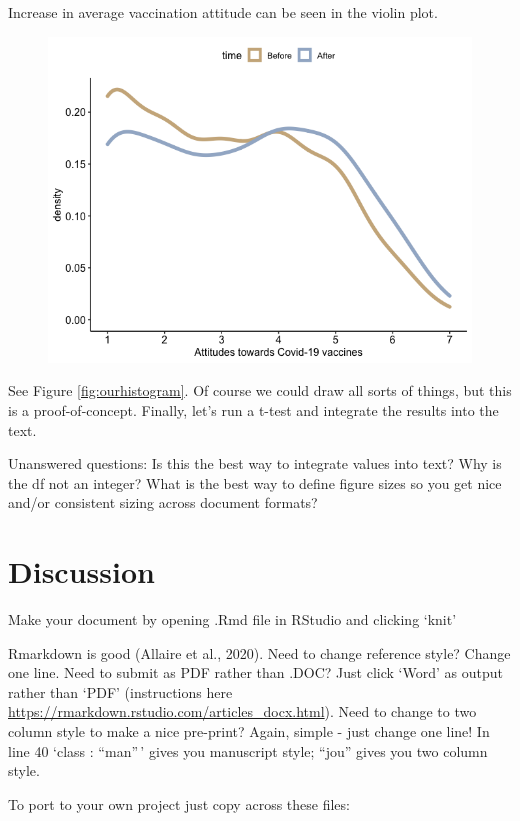 \documentclass[
  english,
  ,jou,floatsintext]{apa6}
\begin{document}
Increase in average vaccination attitude can be seen in the violin plot.

\begin{figure}

{\centering \includegraphics[width=0.75\linewidth]{../plots/raw_density} 

}

\caption{ }\label{fig:figure1}
\end{figure}

See Figure \ref{fig:ourhistogram}. Of course we could draw all sorts of things, but this is a proof-of-concept. Finally, let's run a t-test and integrate the results into the text.

Unanswered questions: Is this the best way to integrate values into text? Why is the df not an integer? What is the best way to define figure sizes so you get nice and/or consistent sizing across document formats?

\hypertarget{discussion}{%
\section{Discussion}\label{discussion}}

Make your document by opening .Rmd file in RStudio and clicking `knit'

Rmarkdown is good (Allaire et al., 2020). Need to change reference style? Change one line. Need to submit as PDF rather than .DOC? Just click `Word' as output rather than `PDF' (instructions here \url{https://rmarkdown.rstudio.com/articles_docx.html}). Need to change to two column style to make a nice pre-print? Again, simple - just change one line! In line 40 `class : ``man''\,' gives you manuscript style; ``jou'' gives you two column style.

To port to your own project just copy across these files:
\end{document}
